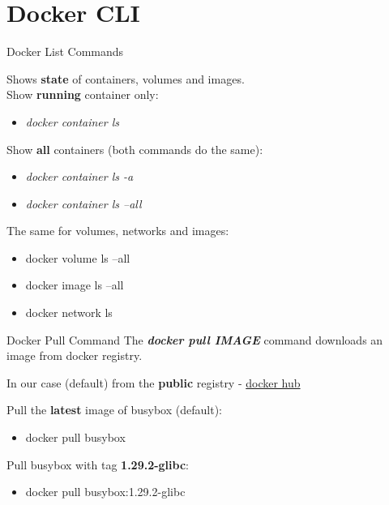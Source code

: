\documentclass[10pt,aspectratio=\ratio,
compress
]{beamer}
\newcommand\meta{./meta}
\begin{document}
\section{Docker CLI}
\begin{frame}{Docker List Commands}

Shows \textbf{state} of containers, volumes and images. \\

Show \textbf{running} container only:
\begin{itemize}
		\item \emph{docker container ls}
\end{itemize}

Show \textbf{all} containers (both commands do the same):
\begin{itemize}
	\item  \emph{docker container ls -a}
	\item  \emph{docker container ls --all}
\end{itemize}

The same for volumes, networks and images:
\begin{itemize}
	\item docker volume ls --all
    \item docker image ls --all
    \item docker network ls
\end{itemize}
\end{frame}

\begin{frame}{Docker Pull Command}
The \emph{\textbf{docker pull IMAGE}} command downloads an image from docker registry.

In our case (default) from the \textbf{public} registry - \href{https://hub.docker.com/}{docker hub}

Pull the \textbf{latest} image of busybox (default):
\begin{itemize}
	\item docker pull busybox
\end{itemize}

Pull busybox with tag \textbf{1.29.2-glibc}:
\begin{itemize}
	\item docker pull busybox:1.29.2-glibc
\end{itemize}
\end{frame}
\end{document}
